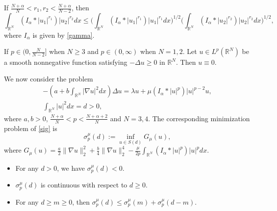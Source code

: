 \documentclass[reqno]{amsart}
\begin{document}
\begin{lemma}\label{qxz3}
If $\frac{N+\alpha}{N}<r_1,r_2<\frac{N+\alpha}{N-2}$, then
\[
\int_{\mathbb{R}^N}(I_\alpha\ast|u_1|^{r_1})|u_2|^{r_2}dx
\leq\Big(\int_{\mathbb{R}^N}(I_\alpha\ast|u_1|^{r_1})|u_1|^{r_1}dx\Big)^{1/2}
\Big(\int_{\mathbb{R}^N}(I_\alpha\ast|u_2|^{r_2})|u_2|^{r_2}dx\Big)^{1/2},
\]
where $I_\alpha$ is given by \eqref{gamma}.
\end{lemma}


\begin{lemma}[{\cite[Lemma A.2]{em}}] \label{Liuv}
If $p\in(0,\frac{N}{N-2}]$ when $N\geq3$ and $p\in(0,\infty)$ when $N=1,2$. 
Let $u\in L^p(\mathbb{R}^N)$ be a smooth nonnegative function
satisfying $-\Delta u\geq0$ in $\mathbb{R}^N$. Then $u\equiv0$.
\end{lemma}

We now consider the problem
\begin{equation}\label{sig}
\begin{gathered}
-(a+b\int_{\mathbb{R}^N}|\nabla u|^2dx)\Delta u
=\lambda u+\mu(I_\alpha\ast|u|^p)|u|^{p-2}u,\\
\int_{\mathbb{R}^N}|u|^2dx=d>0,
\end{gathered}
\end{equation}
where $a,b>0$, $\frac{N+\alpha}{N}<p<\frac{N+\alpha+2}{N}$ and $N=3,4$. 
The corresponding minimization problem of \eqref{sig} is
\begin{equation}\label{ehs}
\sigma_p^{\mu}(d):=\inf_{u\in S(d)} G_\mu(u),
\end{equation}
where $G_\mu(u)=\frac{a}{2}\| \nabla u\|_2^2+\frac{b}{4}\| \nabla u\|_2^4
-\frac{\mu}{2p} \int_{\mathbb{R}^N}(I_\alpha\ast|u|^p)|u|^pdx$.

\begin{lemma}\label{byg}
\begin{itemize}
\item[(i)]   For any $d>0$, we have $\sigma_p^{\mu}(d)<0$.
\item[(ii)] $\sigma_p^{\mu}(d)$ is continuous with respect to $d\geq0$.
\item[(iii)] For any $d\geq m\geq0$, then 
$\sigma_p^{\mu}(d)\leq\sigma_p^{\mu}(m)+\sigma_p^{\mu}(d-m)$.
\end{itemize}
\end{lemma}
\end{document}

